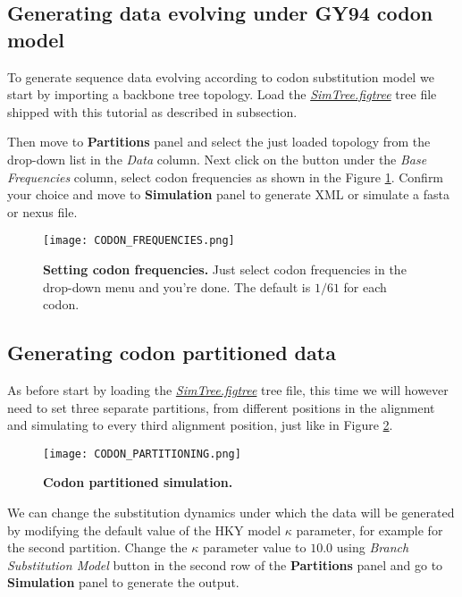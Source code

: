 \subsection{Generating data evolving under GY94 codon model}

To generate sequence data evolving according to codon substitution model we start by importing a backbone tree topology. 
Load the \href{http://rega.kuleuven.be/cev/ecv/software/buss_files/simtree.figtree}{\emph{SimTree.figtree}} tree file shipped with this tutorial as described in \emph{\loading} subsection.   

Then move to \textbf{Partitions} panel and select the just loaded topology from the drop-down list in the \emph{Data} column. 
Next click on the button under the \emph{Base Frequencies} column, select codon frequencies as shown in the Figure \ref{fig:CodonFrequencies}.
Confirm your choice and move to \textbf{Simulation} panel to generate XML or simulate a fasta or nexus file.

\begin{figure}[h!]
\centering
\texttt{[image: CODON\_FREQUENCIES.png]} 
\caption{
{ \footnotesize 
{\bf Setting codon frequencies.}
Just select codon frequencies in the drop-down menu and you're done. The default is $1/61$ for each codon.
} %
}
\label{fig:CodonFrequencies}
\end{figure}

\subsection{Generating codon partitioned data}
As before start by loading the \href{http://rega.kuleuven.be/cev/ecv/software/buss_files/simtree.figtree}{\emph{SimTree.figtree}} tree file, this time we will however need to set three separate partitions, from different positions in the alignment and simulating to every third alignment position, just like in Figure \ref{fig:CodonPartitoning}.

\begin{figure}[h!]
\centering
\texttt{[image: CODON\_PARTITIONING.png]} 
\caption{
{ \footnotesize 
{\bf Codon partitioned simulation.}
} %
}
\label{fig:CodonPartitoning}
\end{figure}

We can change the substitution dynamics under which the data will be generated by modifying the default value of the HKY model $\kappa$ parameter, for example for the second partition.
Change the $\kappa$ parameter value to $10.0$ using \emph{Branch Substitution Model} button in the second row of the \textbf{Partitions} panel and go to \textbf{Simulation} panel to generate the output.

